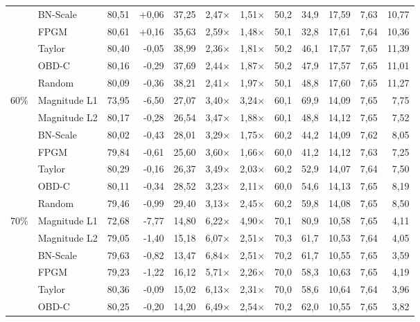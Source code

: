 \begin{table}[H]
{{\begin{tabular}{c l rr rrr rr rrr}
     & BN-Scale & 80,51 & +0,06 & 37,25 & 2,47$\times$ & 1,51$\times$ & 50,2 & 34,9 & 17,59 & 7,63 & 10,77 \\
     & FPGM & 80,61 & +0,16 & 35,63 & 2,59$\times$ & 1,48$\times$ & 50,1 & 32,8 & 17,61 & 7,64 & 10,36 \\
     & Taylor & 80,40 & -0,05 & 38,99 & 2,36$\times$ & 1,81$\times$ & 50,2 & 46,1 & 17,57 & 7,65 & 11,39 \\
     & OBD-C & 80,16 & -0,29 & 37,69 & 2,44$\times$ & 1,87$\times$ & 50,2 & 47,9 & 17,57 & 7,65 & 11,01 \\
     & Random & 80,09 & -0,36 & 38,21 & 2,41$\times$ & 1,97$\times$ & 50,1 & 48,8 & 17,60 & 7,65 & 11,27 \\
    \midrule
    \multirow{7}{*}{60\%} & Magnitude L1 & 73,95 & -6,50 & 27,07 & 3,40$\times$ & 3,24$\times$ & 60,1 & 69,9 & 14,09 & 7,65 & 7,75 \\
     & Magnitude L2 & 80,17 & -0,28 & 26,54 & 3,47$\times$ & 1,88$\times$ & 60,1 & 48,8 & 14,12 & 7,65 & 7,52 \\
     & BN-Scale & 80,02 & -0,43 & 28,01 & 3,29$\times$ & 1,75$\times$ & 60,2 & 44,2 & 14,09 & 7,62 & 8,05 \\
     & FPGM & 79,84 & -0,61 & 25,60 & 3,60$\times$ & 1,66$\times$ & 60,0 & 41,2 & 14,12 & 7,63 & 7,25 \\
     & Taylor & 80,29 & -0,16 & 26,37 & 3,49$\times$ & 2,03$\times$ & 60,2 & 52,9 & 14,07 & 7,64 & 7,50 \\
     & OBD-C & 80,11 & -0,34 & 28,52 & 3,23$\times$ & 2,11$\times$ & 60,0 & 54,6 & 14,13 & 7,65 & 8,19 \\
     & Random & 79,46 & -0,99 & 29,40 & 3,13$\times$ & 2,45$\times$ & 60,2 & 59,8 & 14,08 & 7,65 & 8,50 \\
    \midrule
    \multirow{7}{*}{70\%} & Magnitude L1 & 72,68 & -7,77 & 14,80 & 6,22$\times$ & 4,90$\times$ & 70,1 & 80,9 & 10,58 & 7,65 & 4,11 \\
     & Magnitude L2 & 79,05 & -1,40 & 15,18 & 6,07$\times$ & 2,51$\times$ & 70,3 & 61,7 & 10,53 & 7,64 & 4,05 \\
     & BN-Scale & 79,63 & -0,82 & 13,47 & 6,84$\times$ & 2,51$\times$ & 70,2 & 61,7 & 10,55 & 7,65 & 3,59 \\
     & FPGM & 79,23 & -1,22 & 16,12 & 5,71$\times$ & 2,26$\times$ & 70,0 & 58,3 & 10,63 & 7,65 & 4,19 \\
     & Taylor & 80,36 & -0,09 & 15,02 & 6,13$\times$ & 2,31$\times$ & 70,0 & 58,6 & 10,64 & 7,64 & 3,96 \\
     & OBD-C & 80,25 & -0,20 & 14,20 & 6,49$\times$ & 2,54$\times$ & 70,2 & 62,0 & 10,55 & 7,65 & 3,82 \\

\end{tabular}}}
\end{table}
